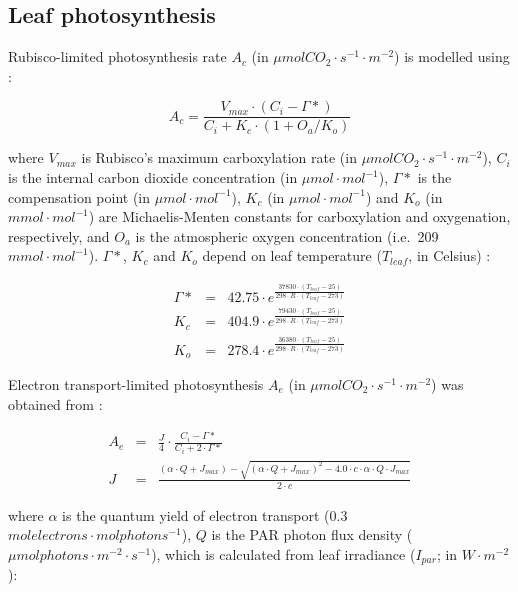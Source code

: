 \documentclass[]{book}
\begin{document}
\subsection{Leaf photosynthesis}\label{leaf-photosynthesis}

Rubisco-limited photosynthesis rate \(A_c\) (in
\(\mu mol CO_2 \cdot s^{-1} \cdot m^{-2}\)) is modelled using
\citep{Collatz1991, Medlyn2002}:

\begin{equation}
A_c=\frac{V_{max}\cdot (C_i- \Gamma*)}{C_i+K_c \cdot (1+ O_a/K_o)}
\end{equation}

where \(V_{max}\) is Rubisco's maximum carboxylation rate (in
\(\mu mol CO_2 \cdot s^{-1} \cdot m^{-2}\)), \(C_i\) is the internal
carbon dioxide concentration (in \(\mu mol \cdot mol^{-1}\)),
\(\Gamma*\) is the compensation point (in \(\mu mol \cdot mol^{-1}\)),
\(K_c\) (in \(\mu mol \cdot mol^{-1}\)) and \(K_o\) (in
\(mmol \cdot mol^{-1}\)) are Michaelis-Menten constants for
carboxylation and oxygenation, respectively, and \(O_a\) is the
atmospheric oxygen concentration (i.e.~209 \(mmol \cdot mol^{-1}\)).
\(\Gamma*\), \(K_c\) and \(K_o\) depend on leaf temperature
(\(T_{leaf}\), in Celsius) \citep{Bernacchi2001}:

\begin{eqnarray}
\Gamma* &=& 42.75\cdot e^{\frac{37830\cdot (T_{leaf}-25)}{298\cdot R \cdot (T_{leaf}-273)}}\\
K_c &=& 404.9\cdot e^{\frac{79430\cdot (T_{leaf}-25)}{298\cdot R \cdot (T_{leaf}-273)}}\\
K_o &=& 278.4\cdot e^{\frac{36380\cdot (T_{leaf}-25)}{298\cdot R \cdot (T_{leaf}-273)}}
\end{eqnarray}

Electron transport-limited photosynthesis \(A_e\) (in
\(\mu mol CO_2 \cdot s^{-1} \cdot m^{-2}\)) was obtained from
\citet{Medlyn2002}:

\begin{eqnarray}
A_e &=& \frac{J}{4}\cdot \frac{C_i-\Gamma*}{C_i+2\cdot \Gamma*} \\
J &=& \frac{(\alpha\cdot Q + J_{max})-\sqrt{(\alpha\cdot Q + J_{max})^2-4.0\cdot c \cdot \alpha \cdot Q \cdot J_{max}}}{2\cdot c}
\end{eqnarray}

where \(\alpha\) is the quantum yield of electron transport (0.3
\(mol electrons \cdot mol photons^{-1}\)), \(Q\) is the PAR photon flux
density (\(\mu mol photons \cdot m^{-2} \cdot s^{-1}\)), which is
calculated from leaf irradiance (\(I_{par}\); in \(W \cdot m^{-2}\)):
\end{document}
